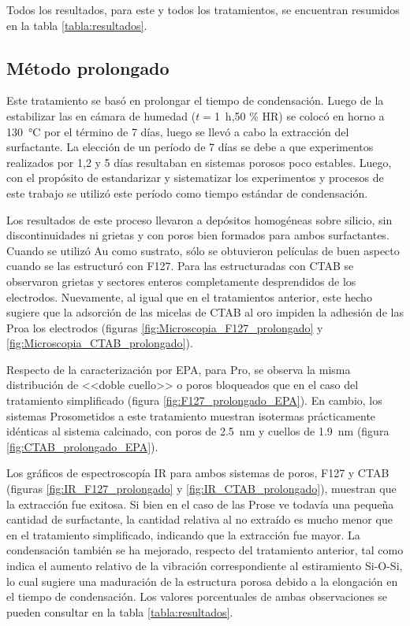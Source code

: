			 Todos los resultados, para este y todos los tratamientos, se encuentran resumidos en la tabla \ref{tabla:resultados}.

	 \subsection{Método prolongado}

	 	 Este tratamiento se basó en prolongar el tiempo de condensación. Luego de la estabilizar las \pdm\space en cámara de humedad ($t=$\SI{1}{\hour},50 \% HR) se colocó en horno a \SI{130}{\celsius} por el término de 7 días, luego se llevó a cabo la extracción del surfactante. La elección de un período de 7 días se debe a que experimentos realizados por 1,2 y 5 días resultaban en sistemas porosos poco estables. Luego, con el propósito de estandarizar y sistematizar los experimentos y procesos de este trabajo se utilizó este período como tiempo estándar de condensación.

	 	 Los resultados de este proceso llevaron a depósitos homogéneas sobre silicio, sin discontinuidades ni grietas y con poros bien formados para ambos surfactantes. Cuando se utilizó Au como sustrato, sólo se obtuvieron películas de buen aspecto cuando se las estructuró con F127. Para las estructuradas con CTAB se observaron grietas y sectores enteros completamente desprendidos de los electrodos. Nuevamente, al igual que en el tratamientos anterior, este hecho sugiere que la adsorción de las micelas de CTAB al oro impiden la adhesión de las Pro\pdmC\space a los electrodos (figuras \ref{fig:Microscopia_F127_prolongado} y \ref{fig:Microscopia_CTAB_prolongado}).

	 	 Respecto de la caracterización por EPA, para Pro\pdmF, se observa la misma distribución de <<doble cuello>> o poros bloqueados que en el caso del tratamiento simplificado (figura \ref{fig:F127_prolongado_EPA}). En cambio, los sistemas Pro\pdmC\space sometidos a este tratamiento muestran isotermas prácticamente idénticas al sistema calcinado, con poros de \SI{2,5}{\nm} y cuellos de \SI{1,9}{\nm} (figura \ref{fig:CTAB_prolongado_EPA}).

	 	 Los gráficos de espectroscopía IR para ambos sistemas de poros, F127 y CTAB (figuras \ref{fig:IR_F127_prolongado} y \ref{fig:IR_CTAB_prolongado}), muestran que la extracción fue exitosa. Si bien en el caso de las Pro\pdmC\space se ve todavía una pequeña cantidad de surfactante, la cantidad relativa al no extraído es mucho menor que en el tratamiento simplificado, indicando que la extracción fue mayor. La condensación también se ha mejorado, respecto del tratamiento anterior, tal como indica el aumento relativo de la vibración correspondiente al estiramiento Si-O-Si, lo cual sugiere una maduración de la estructura porosa debido a la elongación en el tiempo de condensación. Los valores porcentuales de ambas observaciones se pueden consultar en la tabla \ref{tabla:resultados}.

